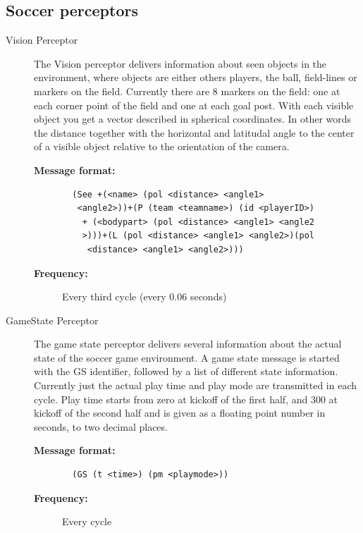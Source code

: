 \subsection{Soccer perceptors}
\begin{description}
  \item [Vision Perceptor]
  The Vision perceptor delivers information about seen objects in the environment, where objects are either others players, the ball, field-lines or markers on the field. Currently there are 8 markers on the field: one at each corner point of the field and one at each goal post. With each visible object you get a vector described in spherical coordinates. In other words the distance together with the horizontal and latitudal angle to the center of a visible object relative to the orientation of the camera.
 \begin{description}
  \item[{\bf Message format:}]
  \begin{verbatim}
  (See +(<name> (pol <distance> <angle1>
   <angle2>))+(P (team <teamname>) (id <playerID>)
    + (<bodypart> (pol <distance> <angle1> <angle2
    >)))+(L (pol <distance> <angle1> <angle2>)(pol
     <distance> <angle1> <angle2>)))
  \end{verbatim}
  \item[{\bf Frequency:}]
 Every third cycle (every 0.06 seconds)
  \end{description}


  \item [GameState Perceptor]
  The game state perceptor delivers several information about the actual state of the soccer game environment. A game state message is started with the GS identifier, followed by a list of different state information. Currently just the actual play time and play mode are transmitted in each cycle. Play time starts from zero at kickoff of the first half, and 300 at kickoff of the second half and is given as a floating point number in seconds, to two decimal places.
     \begin{description}
  \item[{\bf Message format:}]
  \begin{verbatim}
  (GS (t <time>) (pm <playmode>))
  \end{verbatim}
  \item[{\bf Frequency:}]
 Every cycle
  \end{description}






\end{description}
